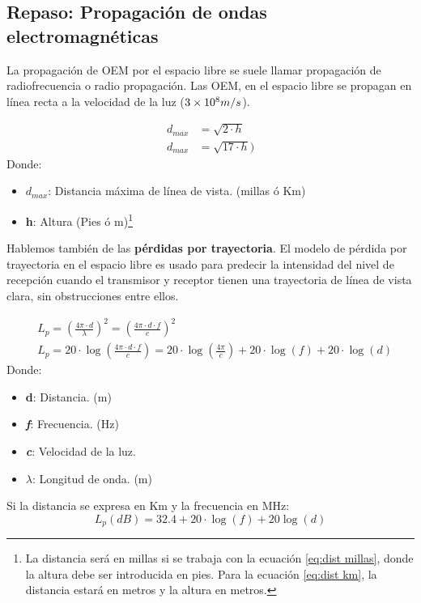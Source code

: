 \documentclass[
	12pt, %
	fleqn, %
	a4paper, %
	oneside, %
]{LegrandOrangeBook}
\begin{document}
\subsection{Repaso: Propagación de ondas electromagnéticas}
La propagación de OEM por el espacio libre se suele llamar propagación de radiofrecuencia o radio propagación. Las OEM, en el espacio libre se propagan en línea recta a la velocidad de la luz ($3\times 10^{8}m/s$). 
\begin{definition}
\begin{subequations}
\begin{align}
d_{max}&=\sqrt{2\cdot h}
\label{eq:dist millas} \\
d_{max}&=\sqrt{17\cdot h})\label{eq:dist km}
\end{align}
\end{subequations}
Donde:
\begin{itemize}
\item $d_{max}$: Distancia máxima de línea de vista. (millas ó Km)
\item \textbf{h}: Altura (Pies ó m)\footnote{La distancia será en millas si se trabaja con la ecuación \ref{eq:dist millas}, donde la altura debe ser introducida en pies. Para la ecuación \ref{eq:dist km}, la distancia estará en metros y la altura en metros.}
\end{itemize}
\end{definition}
Hablemos también de las \textbf{pérdidas por trayectoria}. El modelo de pérdida por trayectoria en el espacio libre es usado para predecir la intensidad del nivel de recepción cuando el transmisor y receptor tienen una trayectoria de línea de vista clara, sin obstrucciones entre ellos.
\begin{definition}
\begin{subequations}
\begin{align}
&L_p=\left(\frac{4\pi\cdot d}{\lambda}\right)^2=\left(\frac{4\pi\cdot d\cdot f}{c}\right)^2
\label{eq:perdidas trayec adimensional} \\
&L_p=20\cdot\log\left(\frac{4\pi\cdot d\cdot f}{c}\right)=20\cdot\log\left(\frac{4\pi}{c}\right)+20\cdot\log(f)+20\cdot\log(d)\label{eq:perdidas trayec db}
\end{align}
\end{subequations}
Donde:
\begin{itemize}
\item \textbf{d}: Distancia. (m)
\item \textbf{\textit{f}}: Frecuencia. (Hz)
\item \textbf{\textit{c}}: Velocidad de la luz.
\item $\lambda$: Longitud de onda. (m)
\end{itemize}
Si la distancia se expresa en Km y la frecuencia en MHz:
\begin{equation}
L_p(dB)=32.4+20\cdot\log(f)+20\log(d)
\end{equation}
\end{definition}
\end{document}
